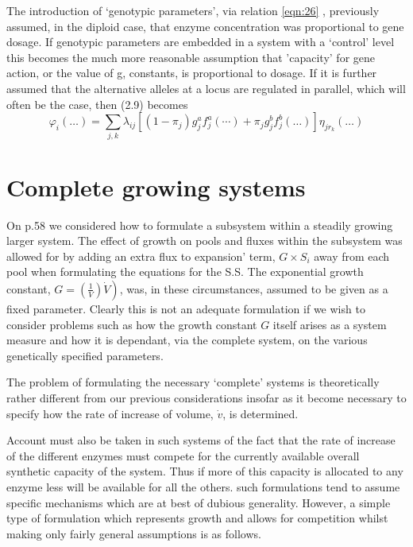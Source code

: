 The introduction of `genotypic parameters', via relation \eqref{eqn:26} , previously assumed, in the diploid case, that enzyme concentration was proportional to gene dosage. If genotypic parameters are embedded in a system with a `control' level this becomes the much more reasonable assumption that 'capacity' for gene action, or the value of g, constants,  is proportional to dosage. If it is further assumed that the alternative alleles at a locus are regulated in parallel, which will often be the case, then (2.9) becomes
%
\begin{equation}
\varphi_{i}(\ldots)=\sum_{j, k} \lambda_{ij}\left[\left(1-\pi_{j}\right) g_{j}^{a} f_{j}^{a}(\cdots)+\pi_{j} g_{j}^{b} f_{j}^{b}(\ldots)\right] \eta_{j  r_{k}}(\ldots)
\label{eqn:210}
\end{equation}
%
\section{Complete growing systems}

On p.58 we considered how to formulate a subsystem within a steadily growing larger system. The effect of growth on pools and fluxes within the subsystem was allowed for by adding an extra flux to expansion' term, $G \times S_i$ away from each pool when formulating the equations for the S.S. The exponential growth constant, $\left.G=\left(\frac{1}{V}\right) {\dot{V}}\right)$, was, in these circumstances, assumed to be given as a fixed parameter. Clearly this is not an adequate formulation if we wish to consider problems such as how the growth constant $G$ itself arises as a system measure and how it is dependant, via the complete system, on the various genetically specified parameters.

The problem of formulating the necessary `complete' systems is theoretically rather different from our previous considerations insofar as it become necessary to specify how the rate of increase of volume, $\dot{v}$, is determined.

Account must also be taken in such systems of the fact that the rate of increase of the different enzymes must compete for the currently available overall synthetic capacity of the system. Thus if more of this capacity is allocated to any enzyme less will be available for all the others. such formulations tend to assume specific mechanisms which are at best of dubious generality. However, a simple type of formulation which represents growth and allows for competition whilst making only fairly general assumptions is as follows.

